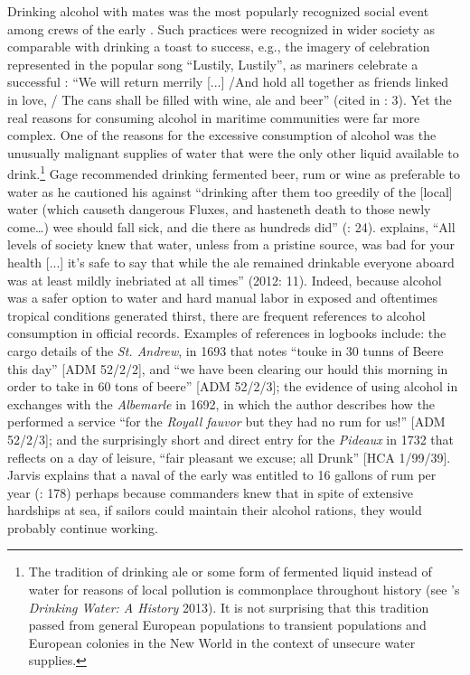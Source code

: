 Drinking alcohol with  mates was the most popularly recognized social event among crews of the early . Such practices were recognized in wider society as comparable with drinking a toast to success, e.g., the imagery of celebration represented in the popular song “Lustily, Lustily”, as mariners celebrate a successful : “We will return merrily [...] /And hold all together as friends linked in love, / The cans shall be filled with wine, ale and beer” (cited in \citealt{Palmer1986}: 3). Yet the real reasons for consuming alcohol in maritime communities were far more complex. One of the reasons for the excessive consumption of alcohol was the unusually malignant supplies of water that were the only other liquid available to drink.\footnote{The tradition of drinking ale or some form of fermented liquid instead of water for reasons of local pollution is commonplace throughout history (see \citeauthor{Salzman2013}’s \textit{Drinking Water: A History} 2013). It is not surprising that this tradition passed from general European populations to transient populations and European colonies in the New World in the context of unsecure water supplies.}  Gage recommended drinking fermented beer, rum or wine as preferable to water as he cautioned his  against “drinking after them too greedily of the [local] water (which causeth dangerous Fluxes, and hasteneth death to those newly come…) wee should fall sick, and die there as hundreds did” (\citealt{Gage1648}: 24). \citeauthor{Bicheno2012} explains, “All levels of society knew that water, unless from a pristine source, was bad for your health [...] it’s safe to say that while the ale remained drinkable everyone aboard was at least mildly inebriated at all times” (2012: 11). Indeed, because alcohol was a safer option to water and hard manual labor in exposed and oftentimes tropical conditions generated thirst, there are frequent references to alcohol consumption in official records. Examples of references in logbooks include: the cargo details of the \textit{St. Andrew}, in 1693 that notes “touke in 30 tunns of Beere this day” [ADM 52/2/2], and “we have been clearing our hould this morning in order to take in 60 tons of beere” [ADM 52/2/3]; the evidence of using alcohol in  exchanges with the \textit{Albemarle} in 1692, in which the author describes how the  performed a service “for the \textit{Royall fauvor} but they had no rum for us!” [ADM 52/2/3]; and the surprisingly short and direct entry for the \textit{Pideaux} in 1732 that reflects on a day of leisure, “fair pleasant we excuse; all Drunk” [HCA 1/99/39]. Jarvis explains that a naval  of the early  was entitled to 16 gallons of rum per year (\citealt{Jarvis2010}: 178) perhaps because commanders knew that in spite of extensive hardships at sea, if sailors could maintain their alcohol rations, they would probably continue working. 

